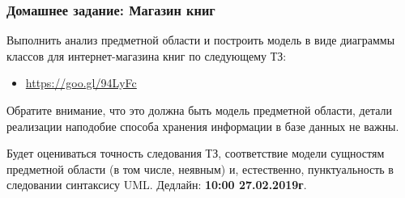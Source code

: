 \documentclass[xetex,mathserif,serif]{beamer}
\begin{document}
	\begin{frame}
		\frametitle{Домашнее задание: Магазин книг}
		Выполнить анализ предметной области и построить модель в виде диаграммы классов для интернет-магазина книг по следующему ТЗ:
		\begin{itemize}
			\item \url{https://goo.gl/94LyFc}
		\end{itemize}

		Обратите внимание, что это должна быть модель предметной области, детали реализации наподобие способа хранения информации в базе данных не важны.

		Будет оцениваться точность следования ТЗ, соответствие модели сущностям предметной области (в том числе, неявным) и, естественно, пунктуальность в следовании синтаксису UML.
		\bigskip
		Дедлайн: \textbf{10:00 27.02.2019г}.
	\end{frame}
\end{document}
